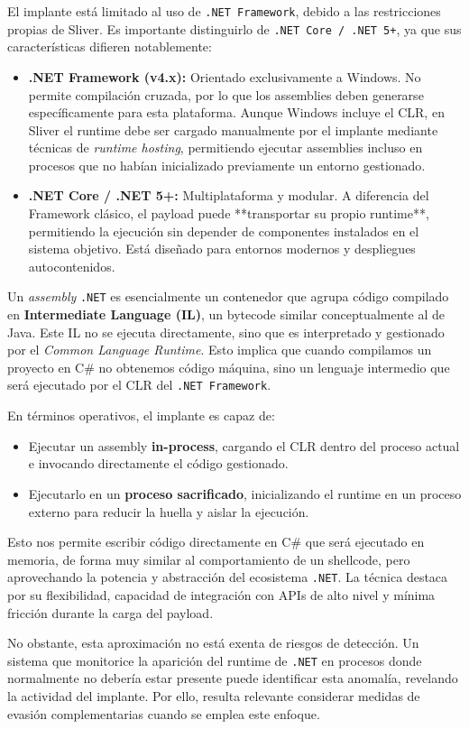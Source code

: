 El implante está limitado al uso de \texttt{.NET Framework}, debido a las restricciones propias de Sliver. Es importante distinguirlo de \texttt{.NET Core / .NET 5+}, ya que sus características difieren notablemente:

\begin{itemize}
    \item \textbf{.NET Framework (v4.x):} Orientado exclusivamente a Windows. No permite compilación cruzada, por lo que los assemblies deben generarse específicamente para esta plataforma. Aunque Windows incluye el CLR, en Sliver el runtime debe ser cargado manualmente por el implante mediante técnicas de \textit{runtime hosting}, permitiendo ejecutar assemblies incluso en procesos que no habían inicializado previamente un entorno gestionado.
    \item \textbf{.NET Core / .NET 5+:} Multiplataforma y modular. A diferencia del Framework clásico, el payload puede **transportar su propio runtime**, permitiendo la ejecución sin depender de componentes instalados en el sistema objetivo. Está diseñado para entornos modernos y despliegues autocontenidos.
\end{itemize}

Un \textit{assembly} \texttt{.NET} es esencialmente un contenedor que agrupa código compilado en \textbf{Intermediate Language (IL)}, un bytecode similar conceptualmente al de Java. Este IL no se ejecuta directamente, sino que es interpretado y gestionado por el \textit{Common Language Runtime}. Esto implica que cuando compilamos un proyecto en C\# no obtenemos código máquina, sino un lenguaje intermedio que será ejecutado por el CLR del \texttt{.NET Framework}.

En términos operativos, el implante es capaz de:

\begin{itemize}
\item Ejecutar un assembly \textbf{in-process}, cargando el CLR dentro del proceso actual e invocando directamente el código gestionado.
\item Ejecutarlo en un \textbf{proceso sacrificado}, inicializando el runtime en un proceso externo para reducir la huella y aislar la ejecución.
\end{itemize}

Esto nos permite escribir código directamente en C\# que será ejecutado en memoria, de forma muy similar al comportamiento de un shellcode, pero aprovechando la potencia y abstracción del ecosistema \texttt{.NET}. La técnica destaca por su flexibilidad, capacidad de integración con APIs de alto nivel y mínima fricción durante la carga del payload.

No obstante, esta aproximación no está exenta de riesgos de detección. Un sistema que monitorice la aparición del runtime de \texttt{.NET} en procesos donde normalmente no debería estar presente puede identificar esta anomalía, revelando la actividad del implante. Por ello, resulta relevante considerar medidas de evasión complementarias cuando se emplea este enfoque.